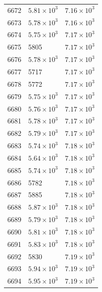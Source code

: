\begin{table}[H]
\begin{tabular}{lll}
6672 & $\displaystyle 5.81 \times 10^{3}$ & $\displaystyle 7.16 \times 10^{3}$ \\
6673 & $\displaystyle 5.78 \times 10^{3}$ & $\displaystyle 7.16 \times 10^{3}$ \\
6674 & $\displaystyle 5.75 \times 10^{3}$ & $\displaystyle 7.17 \times 10^{3}$ \\
6675 & 5805 & $\displaystyle 7.17 \times 10^{3}$ \\
6676 & $\displaystyle 5.78 \times 10^{3}$ & $\displaystyle 7.17 \times 10^{3}$ \\
6677 & 5717 & $\displaystyle 7.17 \times 10^{3}$ \\
6678 & 5772 & $\displaystyle 7.17 \times 10^{3}$ \\
6679 & $\displaystyle 5.75 \times 10^{3}$ & $\displaystyle 7.17 \times 10^{3}$ \\
6680 & $\displaystyle 5.76 \times 10^{3}$ & $\displaystyle 7.17 \times 10^{3}$ \\
6681 & $\displaystyle 5.78 \times 10^{3}$ & $\displaystyle 7.17 \times 10^{3}$ \\
6682 & $\displaystyle 5.79 \times 10^{3}$ & $\displaystyle 7.17 \times 10^{3}$ \\
6683 & $\displaystyle 5.74 \times 10^{3}$ & $\displaystyle 7.18 \times 10^{3}$ \\
6684 & $\displaystyle 5.64 \times 10^{3}$ & $\displaystyle 7.18 \times 10^{3}$ \\
6685 & $\displaystyle 5.74 \times 10^{3}$ & $\displaystyle 7.18 \times 10^{3}$ \\
6686 & 5782 & $\displaystyle 7.18 \times 10^{3}$ \\
6687 & 5885 & $\displaystyle 7.18 \times 10^{3}$ \\
6688 & $\displaystyle 5.87 \times 10^{3}$ & $\displaystyle 7.18 \times 10^{3}$ \\
6689 & $\displaystyle 5.79 \times 10^{3}$ & $\displaystyle 7.18 \times 10^{3}$ \\
6690 & $\displaystyle 5.81 \times 10^{3}$ & $\displaystyle 7.18 \times 10^{3}$ \\
6691 & $\displaystyle 5.83 \times 10^{3}$ & $\displaystyle 7.18 \times 10^{3}$ \\
6692 & 5830 & $\displaystyle 7.19 \times 10^{3}$ \\
6693 & $\displaystyle 5.94 \times 10^{3}$ & $\displaystyle 7.19 \times 10^{3}$ \\
6694 & $\displaystyle 5.95 \times 10^{3}$ & $\displaystyle 7.19 \times 10^{3}$ \\

\end{tabular}
\end{table}
